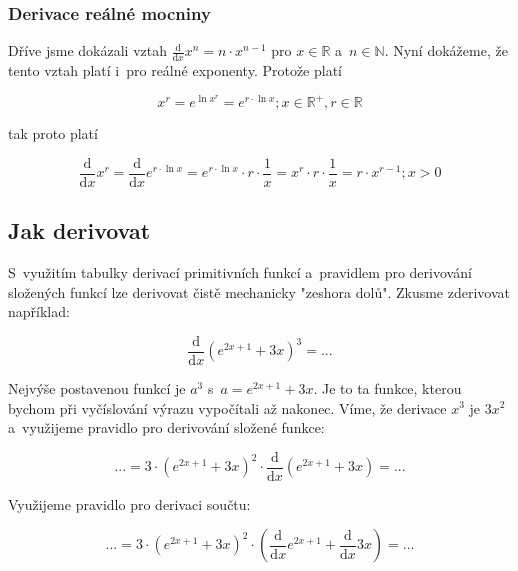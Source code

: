 \subsubsection{Derivace reálné mocniny}

Dříve jsme dokázali vztah \(\frac{\mathrm{d}}{\mathrm{d}x} x^n = n \cdot x^{n-1}\) pro \(x \in \mathbb{R}\) a~\(n \in \mathbb{N}\). Nyní dokážeme, že tento vztah platí i~pro reálné exponenty. Protože platí

\begin{equation}
x^r = e^{\ln x^r} = e^{r \cdot \ln x}; x \in \mathbb{R}^+, r \in \mathbb{R}
\end{equation}

tak proto platí

\begin{equation}
\frac{\mathrm{d}}{\mathrm{d}x} x^r = \frac{\mathrm{d}}{\mathrm{d}x} e^{r \cdot \ln x} = e^{r \cdot \ln x} \cdot r \cdot \frac{1}{x} = x^r \cdot r \cdot \frac{1}{x} = r \cdot x^{r-1}; x > 0
\end{equation}


\subsection{Jak derivovat}

S~využitím tabulky derivací primitivních funkcí a~pravidlem pro derivování složených funkcí lze derivovat čistě mechanicky "zeshora dolů". Zkusme zderivovat například:

\begin{equation}
\frac{\mathrm{d}}{\mathrm{d}x} \left(e^{2x+1} + 3x \right)^3 = ...
\end{equation}

Nejvýše postavenou funkcí je \(a^3\) s~\(a = e^{2x+1} + 3x\). Je to ta funkce, kterou bychom při vyčíslování výrazu vypočítali až nakonec. Víme, že derivace \(x^3\) je \(3 x^2\) a~využijeme pravidlo pro derivování složené funkce:

\begin{equation}
... = 3 \cdot \left(e^{2x+1} + 3x \right)^2 \cdot \frac{\mathrm{d}}{\mathrm{d}x} \left(e^{2x+1} + 3x \right) = ...
\end{equation}

Využijeme pravidlo pro derivaci součtu:

\begin{equation}
... = 3 \cdot \left(e^{2x+1} + 3x \right)^2 \cdot \left(\frac{\mathrm{d}}{\mathrm{d}x} e^{2x+1} + \frac{\mathrm{d}}{\mathrm{d}x} 3x \right) = ...
\end{equation}

